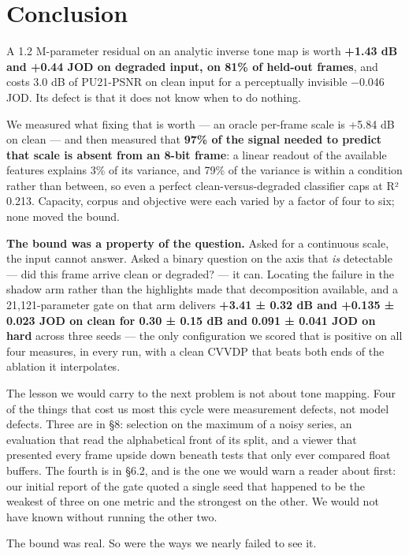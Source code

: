 \hypertarget{conclusion}{%
\section{Conclusion}\label{conclusion}}

A 1.2 M-parameter residual on an analytic inverse tone map is worth \textbf{+1.43 dB
and +0.44 JOD on degraded input, on 81\% of held-out frames}, and costs 3.0 dB
of PU21-PSNR on clean input for a perceptually invisible −0.046 JOD. Its defect
is that it does not know when to do nothing.

We measured what fixing that is worth --- an oracle per-frame scale is +5.84 dB on
clean --- and then measured that \textbf{97\% of the signal needed to predict that scale
is absent from an 8-bit frame}: a linear readout of the available features
explains 3\% of its variance, and 79\% of the variance is within a condition
rather than between, so even a perfect clean-versus-degraded classifier caps at
R² 0.213. Capacity, corpus and objective were each varied by a factor of four to
six; none moved the bound.

\textbf{The bound was a property of the question.} Asked for a continuous scale, the
input cannot answer. Asked a binary question on the axis that \emph{is} detectable ---
did this frame arrive clean or degraded? --- it can. Locating the failure in the
shadow arm rather than the highlights made that decomposition available, and a
21,121-parameter gate on that arm delivers \textbf{+3.41 ± 0.32 dB and
+0.135 ± 0.023 JOD on clean for 0.30 ± 0.15 dB and 0.091 ± 0.041 JOD on hard}
across three seeds --- the only configuration we scored that is positive on all
four measures, in every run, with a clean CVVDP that beats both ends of the
ablation it interpolates.

The lesson we would carry to the next problem is not about tone mapping. Four of
the things that cost us most this cycle were measurement defects, not model
defects. Three are in §8: selection on the maximum of a noisy series, an
evaluation that read the alphabetical front of its split, and a viewer that
presented every frame upside down beneath tests that only ever compared float
buffers. The fourth is in §6.2, and is the one we would warn a reader about
first: our initial report of the gate quoted a single seed that happened to be
the weakest of three on one metric and the strongest on the other. We would not
have known without running the other two.

The bound was real. So were the ways we nearly failed to see it.
